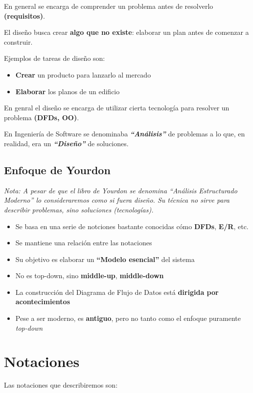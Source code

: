En general se encarga de comprender un problema antes de resolverlo \textbf{(requisitos)}.

El diseño busca crear \textbf{algo que no existe}: elaborar un plan antes de comenzar a construir.

Ejemplos de tareas de diseño son:

\begin{itemize}[noitemsep]
\item \textbf{Crear} un producto para lanzarlo al mercado
\item \textbf{Elaborar} los planos de un edificio
\end{itemize}

En genral el diseño se encarga de utilizar cierta tecnología para resolver un problema \textbf{(DFDs, OO)}.

En Ingeniería de Software se denominaba \textit{\textbf{``Análisis''}} de problemas a lo que, en realidad, era un \textit{\textbf{``Diseño''}} de soluciones.

\subsection{Enfoque de Yourdon}
\textit{Nota: A pesar de que el libro de Yourdon se denomina ``Análisis Estructurado Moderno'' lo consideraremos como si fuera diseño. Su técnica no sirve para describir problemas, sino soluciones (tecnologías).}

\begin{itemize}[noitemsep]
\item Se basa en una serie de notciones bastante conocidas cómo \textbf{DFDs}, \textbf{E/R}, etc.
\item Se mantiene una relación entre las notaciones
\item Su objetivo es elaborar un \textbf{``Modelo esencial''} del sistema
\item No es top-down, sino \textbf{middle-up}, \textbf{middle-down}
\item La construcción del Diagrama de Flujo de Datos está \textbf{dirigida por acontecimientos}
\item Pese a ser moderno, es \textbf{antiguo}, pero no tanto como el enfoque puramente \textit{top-down}
\end{itemize}

\section{Notaciones}
Las notaciones que describiremos son:

